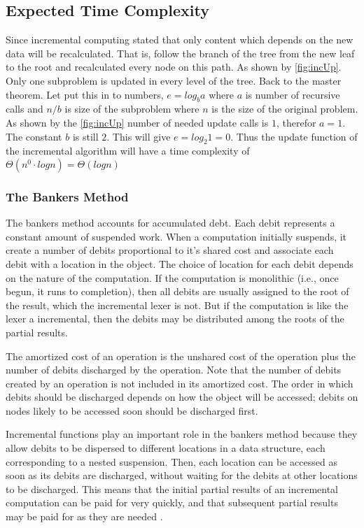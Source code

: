 \subsection{Expected Time Complexity}
Since incremental computing stated that only content which depends on the new
data will be recalculated. That is, follow the branch of the tree from the new
leaf to the root and recalculated every node on this path. 
As shown by \cref{fig:incUp}. Only one subproblem is updated in every level of
the tree. Back to the master theorem. Let put this in to numbers, $e = log_b a$
where $a$ is number of recursive calls and $n/b$ is size of the subproblem where
$n$ is the size of the original problem. As shown by the \cref{fig:incUp} number
of needed update calls is $1$, therefor $a = 1$. The constant $b$ is still $2$.
This will give $e = log_2 1 = 0$. Thus the update function of the incremental
algorithm will have a time complexity of
$\Theta(n^0 \cdot log n) = \Theta(log n)$

\subsubsection{The Bankers Method}
The bankers method accounts for accumulated debt. Each debit represents
a constant amount of suspended work. When a computation initially suspends, it
create a number of debits proportional to it's shared cost and
associate each debit with a location in the object. The choice of location for
each debit depends on the nature of the computation. If the computation is
monolithic (i.e., once begun, it runs to completion), then all debits are
usually assigned to the root of the result, which the incremental lexer is not. 
But if the computation is like the lexer a incremental, then the debits may be 
distributed among the roots of the partial results.

The amortized cost of an operation is the unshared cost of the operation
plus the number of debits discharged by the operation. Note that the number
of debits created by an operation is not included in its amortized cost. The
order in which debits should be discharged depends on how the object will
be accessed; debits on nodes likely to be accessed soon should be discharged
first.

Incremental functions play an important role in the bankers method because
they allow debits to be dispersed to different locations in a data structure,
each corresponding to a nested suspension. Then, each location can be accessed
as soon as its debits are discharged, without waiting for the debits at other
locations to be discharged. This means that the initial partial results of
an incremental computation can be paid for very quickly, and that subsequent
partial results may be paid for as they are needed \cite{Okasaki1999}.

